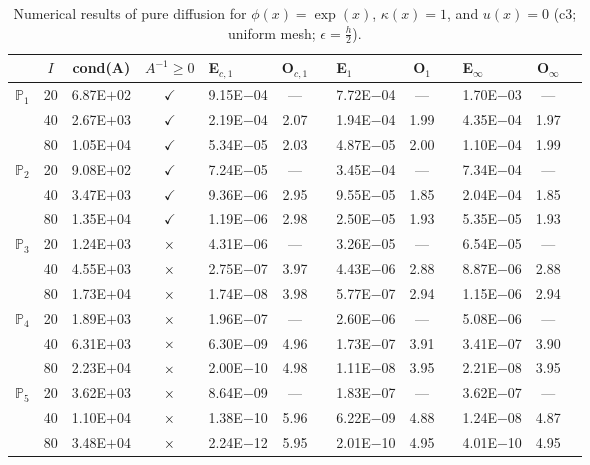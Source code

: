 \begin{table}[H]
\centering
\caption{Numerical results of pure diffusion for $\phi(x)=\exp(x)$, $\kappa(x)=1$, and $u(x)=0$ (c3; uniform mesh; $\epsilon=\frac{h}{2}$).}
\begin{tabular}{@{}l c c c l c c l c c l c c@{}}
\toprule
 & $I$ & cond(A) & $A^{-1}\geq 0$ &  E$_{c,1}$ & O$_{c,1}$ && E$_1$ & O$_1$ && E$_{\infty}$ & O$_{\infty}$\\
\midrule
\multirow{3}{*}{$\mathbb{P}_{1}$}
 & 20 & 6.87E$+$02 & $\checkmark$ & 9.15E$-$04 & --- && 7.72E$-$04 & --- && 1.70E$-$03 & ---\\
 & 40 & 2.67E$+$03 & $\checkmark$ & 2.19E$-$04 & 2.07 && 1.94E$-$04 & 1.99 && 4.35E$-$04 & 1.97\\
 & 80 & 1.05E$+$04 & $\checkmark$ & 5.34E$-$05 & 2.03 && 4.87E$-$05 & 2.00 && 1.10E$-$04 & 1.99\\
\midrule
\multirow{3}{*}{$\mathbb{P}_{2}$}
 & 20 & 9.08E$+$02 & $\checkmark$ & 7.24E$-$05 & --- && 3.45E$-$04 & --- && 7.34E$-$04 & ---\\
 & 40 & 3.47E$+$03 & $\checkmark$ & 9.36E$-$06 & 2.95 && 9.55E$-$05 & 1.85 && 2.04E$-$04 & 1.85\\
 & 80 & 1.35E$+$04 & $\checkmark$ & 1.19E$-$06 & 2.98 && 2.50E$-$05 & 1.93 && 5.35E$-$05 & 1.93\\
\midrule
\multirow{3}{*}{$\mathbb{P}_{3}$}
 & 20 & 1.24E$+$03 & $\times$ & 4.31E$-$06 & --- && 3.26E$-$05 & --- && 6.54E$-$05 & ---\\
 & 40 & 4.55E$+$03 & $\times$ & 2.75E$-$07 & 3.97 && 4.43E$-$06 & 2.88 && 8.87E$-$06 & 2.88\\
 & 80 & 1.73E$+$04 & $\times$ & 1.74E$-$08 & 3.98 && 5.77E$-$07 & 2.94 && 1.15E$-$06 & 2.94\\
\midrule
\multirow{3}{*}{$\mathbb{P}_{4}$}
 & 20 & 1.89E$+$03 & $\times$ & 1.96E$-$07 & --- && 2.60E$-$06 & --- && 5.08E$-$06 & ---\\
 & 40 & 6.31E$+$03 & $\times$ & 6.30E$-$09 & 4.96 && 1.73E$-$07 & 3.91 && 3.41E$-$07 & 3.90\\
 & 80 & 2.23E$+$04 & $\times$ & 2.00E$-$10 & 4.98 && 1.11E$-$08 & 3.95 && 2.21E$-$08 & 3.95\\
\midrule
\multirow{3}{*}{$\mathbb{P}_{5}$}
 & 20 & 3.62E$+$03 & $\times$ & 8.64E$-$09 & --- && 1.83E$-$07 & --- && 3.62E$-$07 & ---\\
 & 40 & 1.10E$+$04 & $\times$ & 1.38E$-$10 & 5.96 && 6.22E$-$09 & 4.88 && 1.24E$-$08 & 4.87\\
 & 80 & 3.48E$+$04 & $\times$ & 2.24E$-$12 & 5.95 && 2.01E$-$10 & 4.95 && 4.01E$-$10 & 4.95\\
\bottomrule
\end{tabular}
\end{table}